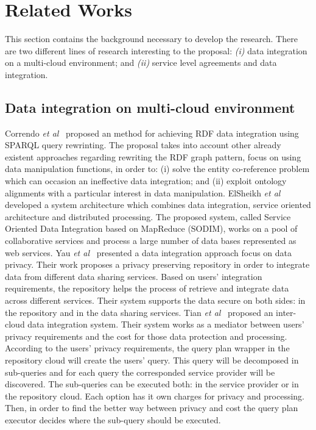 \section{Related Works}\label{sec:rw}
This section contains the background necessary to develop the research.
There are two different lines of research interesting to the proposal:
\textit{(i)} data integration on a multi-cloud environment; and
\textit{(ii)} service level agreements and data integration.

\subsection{Data integration on multi-cloud environment}
Correndo \textit{et al}~\cite{075} proposed an method for achieving RDF data integration
using SPARQL query rewrinting. 
The proposal takes into account other already existent approaches regarding rewriting 
the RDF graph pattern, focus on using data manipulation functions, in order to: (i) solve 
the entity co-reference problem which can occasion an ineffective data integration; 
and (ii) exploit ontology alignments with a particular interest in data manipulation. 
ElSheikh \textit{et al}~\cite{078} developed a system architecture which combines data integration,
service oriented architecture and distributed processing. The proposed system, called Service 
Oriented Data Integration based on MapReduce (SODIM), works on a pool of collaborative services and 
process a large number of data bases represented as web services. 
Yau \textit{et al}~\cite{YauY08} presented a data integration approach focus on data privacy.
Their work proposes a privacy preserving repository in order to integrate data from
different data sharing services. 
Based on users' integration requirements, the repository helps the process of retrieve and integrate
data across different services.
Their system supports the data secure on both sides: in the repository and in the data sharing services. 
Tian \textit{et al}~\cite{096} proposed an inter-cloud data integration system. 
Their system works as a mediator between users' privacy requirements and the cost for those data 
protection and processing.
According to the users' privacy requirements, the query plan wrapper in the repository cloud will
create the users' query. This query will be decomposed in sub-queries and for each query the 
corresponded service provider will be discovered. 
The sub-queries can be executed both: in the service provider or in the repository cloud.
Each option has it own charges for privacy and processing. 
Then, in order to find the better way between privacy and cost the query plan executor decides where 
the sub-query should be executed.

